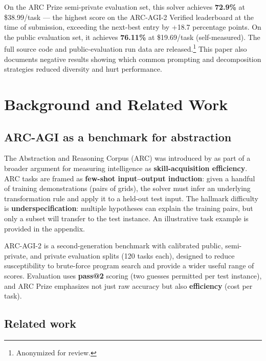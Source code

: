 \documentclass[10pt]{article}
\begin{document}
On the ARC Prize semi-private evaluation set, this solver achieves
\textbf{72.9\%} at \$38.99/task --- the highest score on the ARC-AGI-2
Verified leaderboard at the time of submission, exceeding the next-best
entry by +18.7 percentage points. On the public evaluation set, it
achieves \textbf{76.11\%} at \$19.69/task (self-measured). The full
source code and public-evaluation run data are released.\footnote{Anonymized
  for review.} This paper also documents negative results showing which
common prompting and decomposition strategies reduced diversity and hurt
performance.

\hypertarget{background-and-related-work}{%
\section{Background and Related
Work}\label{background-and-related-work}}

\hypertarget{arc-agi-as-a-benchmark-for-abstraction}{%
\subsection{ARC-AGI as a benchmark for
abstraction}\label{arc-agi-as-a-benchmark-for-abstraction}}

The Abstraction and Reasoning Corpus (ARC) was introduced by
\citet{chollet2019measure} as part of a broader argument for measuring
intelligence as \textbf{skill-acquisition efficiency}. ARC tasks are
framed as \textbf{few-shot input--output induction}: given a handful of
training demonstrations (pairs of grids), the solver must infer an
underlying transformation rule and apply it to a held-out test input.
The hallmark difficulty is \textbf{underspecification}: multiple
hypotheses can explain the training pairs, but only a subset will
transfer to the test instance. An illustrative task example is provided
in the appendix.

ARC-AGI-2 \citep{arcprize2024report} is a second-generation benchmark
with calibrated public, semi-private, and private evaluation splits (120
tasks each), designed to reduce susceptibility to brute-force program
search and provide a wider useful range of scores. Evaluation uses
\textbf{pass@2} scoring (two guesses permitted per test instance), and
ARC Prize emphasizes not just raw accuracy but also \textbf{efficiency}
(cost per task).

\hypertarget{related-work}{%
\subsection{Related work}\label{related-work}}
\end{document}
